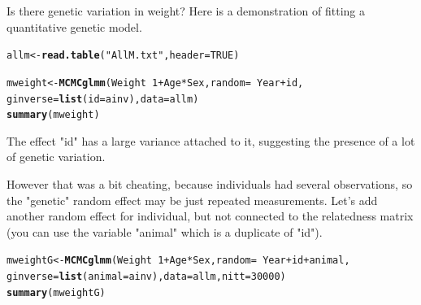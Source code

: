 \documentclass[12pt,a4paper]{scrartcl}\usepackage[]{graphicx}\usepackage[]{color}
\makeatletter
\newcommand{\hlnum}[1]{\textcolor[rgb]{0.686,0.059,0.569}{#1}}%
\newcommand{\hlstr}[1]{\textcolor[rgb]{0.192,0.494,0.8}{#1}}%
\newcommand{\hlopt}[1]{\textcolor[rgb]{0,0,0}{#1}}%
\newcommand{\hlstd}[1]{\textcolor[rgb]{0.345,0.345,0.345}{#1}}%
\newcommand{\hlkwb}[1]{\textcolor[rgb]{0.69,0.353,0.396}{#1}}%
\newcommand{\hlkwc}[1]{\textcolor[rgb]{0.333,0.667,0.333}{#1}}%
\newcommand{\hlkwd}[1]{\textcolor[rgb]{0.737,0.353,0.396}{\textbf{#1}}}%
\newenvironment{kframe}{%
 \def\at@end@of@kframe{}%
 \ifinner\ifhmode%
  \def\at@end@of@kframe{\end{minipage}}%
  \begin{minipage}{\columnwidth}%
 \fi\fi%
 \def\FrameCommand##1{\hskip\@totalleftmargin \hskip-\fboxsep
 \colorbox{shadecolor}{##1}\hskip-\fboxsep
     \hskip-\linewidth \hskip-\@totalleftmargin \hskip\columnwidth}%
 \MakeFramed {\advance\hsize-\width
   \@totalleftmargin\z@ \linewidth\hsize
   \@setminipage}}%
 {\par\unskip\endMakeFramed%
 \at@end@of@kframe}
\newenvironment{knitrout}{}{} %
\makeatother
\begin{document}
Is there genetic variation in weight? Here is a demonstration of fitting a quantitative genetic model.
\begin{knitrout}
\color{fgcolor}\begin{kframe}
\begin{alltt}
\hlstd{allm} \hlkwb{<-} \hlkwd{read.table}\hlstd{(}\hlstr{"AllM.txt"}\hlstd{,} \hlkwc{header} \hlstd{=} \hlnum{TRUE}\hlstd{)}

\hlstd{mweight} \hlkwb{<-} \hlkwd{MCMCglmm}\hlstd{(Weight} \hlopt{~} \hlnum{1} \hlopt{+} \hlstd{Age}\hlopt{*}\hlstd{Sex,} \hlkwc{random}\hlstd{=}\hlopt{~}\hlstd{Year} \hlopt{+} \hlstd{id,}
                    \hlkwc{ginverse} \hlstd{=} \hlkwd{list}\hlstd{(}\hlkwc{id}\hlstd{=ainv),} \hlkwc{data}\hlstd{=allm)}
\hlkwd{summary}\hlstd{(mweight)}
\end{alltt}
\end{kframe}
\end{knitrout}
The effect "id" has a large variance attached to it, suggesting the presence of a lot of genetic variation.

\begin{Exercise}[difficulty=1, title={Is it really genetic?}]
However that was a bit cheating, because individuals had several observations, so the "genetic" random effect may be just repeated measurements. Let's add another random effect for individual, but not connected to the relatedness matrix (you can use the variable "animal" which is a duplicate of "id"). 

\end{Exercise}
\begin{Answer}
\begin{knitrout}
\color{fgcolor}\begin{kframe}
\begin{alltt}
\hlstd{mweightG} \hlkwb{<-} \hlkwd{MCMCglmm}\hlstd{(Weight} \hlopt{~} \hlnum{1} \hlopt{+} \hlstd{Age}\hlopt{*}\hlstd{Sex,} \hlkwc{random}\hlstd{=}\hlopt{~}\hlstd{Year} \hlopt{+} \hlstd{id} \hlopt{+} \hlstd{animal,}
                     \hlkwc{ginverse} \hlstd{=} \hlkwd{list}\hlstd{(}\hlkwc{animal}\hlstd{=ainv),} \hlkwc{data}\hlstd{=allm,} \hlkwc{nitt} \hlstd{=} \hlnum{30000}\hlstd{)}
\hlkwd{summary}\hlstd{(mweightG)}
\end{alltt}
\end{kframe}
\end{knitrout}

\end{Answer}
\end{document}
